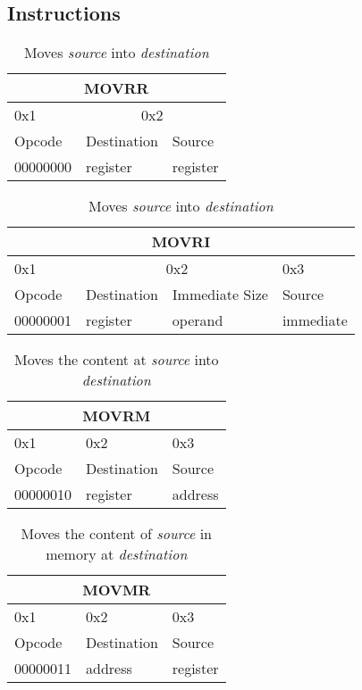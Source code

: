 \documentclass{article}
\begin{document}
\subsection{Instructions}
\begin{table}[h!]
  \centering
  \begin{tabular} { | p{2cm} | | p{2cm} | p{2cm} |}
    \hline
    \multicolumn{3}{|c|}{MOVRR}\\
    \hline
    0x1 & \multicolumn{2}{|c|}{0x2}\\
    \hline
    Opcode & Destination & Source\\
    00000000 & register & register\\
    \hline
  \end{tabular}
  \caption{Moves \textit{source} into \textit{destination}}
\end{table}

\begin{table}[h!]
  \centering
  \begin{tabular} { | p{2cm} | | p{2cm} | p{} | | p{2cm} |}
    \hline
    \multicolumn{4}{|c|}{MOVRI}\\
    \hline
    0x1 & \multicolumn{2}{|c|}{0x2} & 0x3\\
    \hline
    Opcode & Destination & Immediate Size & Source\\
    00000001 & register & operand & immediate\\
    \hline
  \end{tabular}
  \caption{Moves \textit{source} into \textit{destination}}
\end{table}

\begin{table}[h!]
  \centering
  \begin{tabular} { | p{2cm} | | p{2cm} | p{2cm} |}
    \hline
    \multicolumn{3}{|c|}{MOVRM}\\
    \hline
    0x1 & 0x2 & 0x3\\
    \hline
    Opcode & Destination & Source\\
    00000010 & register & address\\
    \hline
  \end{tabular}
  \caption{Moves the content at \textit{source} into \textit{destination}}
\end{table}

\begin{table}[h!]
  \centering
  \begin{tabular} { | p{2cm} | | p{2cm} | p{2cm} |}
    \hline
    \multicolumn{3}{|c|}{MOVMR}\\
    \hline
    0x1 & 0x2 & 0x3\\
    \hline
    Opcode & Destination & Source\\
    00000011 & address & register\\
    \hline
  \end{tabular}
  \caption{Moves the content of \textit{source} in memory at \textit{destination}}
\end{table}
\end{document}

